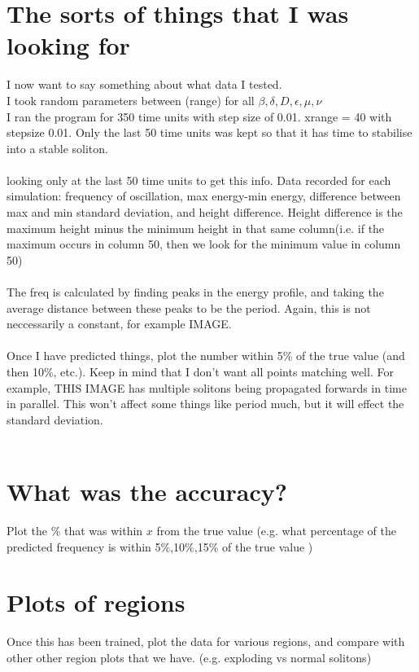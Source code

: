 \documentclass[a4paper,12pt]{report}
\begin{document}
\section{The sorts of things that I was looking for}
I now want to say something about what data I tested.\\
I took random parameters between (range) for all $\beta, \delta, D, \epsilon, \mu, \nu$\\
I ran the program for 350 time units with step size of 0.01. xrange = 40 with stepsize 0.01. Only the last 50 time units was kept so that it has time to stabilise into a stable soliton. 
\\\\
looking only at the last 50 time units to get this info.
Data recorded for each simulation: frequency of oscillation, max energy-min energy,  difference between max and min standard deviation, and height difference. Height difference is the maximum height minus the minimum height in that same column(i.e. if the maximum occurs in column 50, then we look for the minimum value in column 50)
\\\\
The freq is calculated by finding peaks in the energy profile, and taking the average distance between these peaks to be the period. Again, this is not neccessarily a constant, for example IMAGE.
\\\\
Once I have predicted things, plot the number within 5\% of the true value (and then 10\%, etc.). Keep in mind that I don't want all points matching well. For example, THIS IMAGE has multiple solitons being propagated forwards in time in parallel. This won't affect some things like period much, but it will effect the standard deviation. 
\\\\
\section{What was the accuracy?}
Plot the \% that was within $x$ from the true value (e.g. what percentage of the predicted frequency is within 5\%,10\%,15\% of the true value )

\section{Plots of regions}
Once this has been trained, plot the data for various regions, and compare with other other region plots that we have. (e.g. exploding vs normal solitons)
\end{document}
